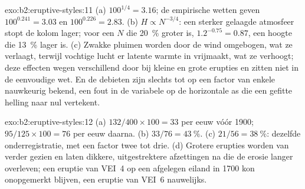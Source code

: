 \begin{solution}{exo:b2:eruptive-styles:11}
(a) $100^{1/4} = 3.16$; de empirische wetten geven $100^{0.241} = 3.03$ en
$100^{0.226} = 2.83$. (b) $H \propto N^{-3/4}$: een sterker gelaagde
atmosfeer stopt de kolom lager; voor een $N$ die \qty{20}{\percent} groter is,
$1.2^{-0.75} = 0.87$, een hoogte die \qty{13}{\percent} lager is. (c) Zwakke pluimen worden
door de wind omgebogen, wat ze verlaagt, terwijl vochtige lucht er latente warmte in
vrijmaakt, wat ze verhoogt; deze effecten wegen verschillend door bij kleine en grote
erupties en zitten niet in de eenvoudige wet. En de debieten zijn slechts tot op een factor
van enkele nauwkeurig bekend, een fout in de variabele op de horizontale as die
een gefitte helling naar nul vertekent.
\end{solution}

\begin{solution}{exo:b2:eruptive-styles:12}
(a) $132/400\times100 = 33$ per eeuw vóór 1900; $95/125\times100 = 76$ per
eeuw daarna. (b) $33/76 = \qty{43}{\percent}$. (c) $21/56 = \qty{38}{\percent}$:
dezelfde onderregistratie, met een factor twee tot drie. (d) Grotere erupties worden
van verder gezien en laten dikkere, uitgestrektere afzettingen na die de erosie
langer overleven; een eruptie van VEI~4 op een afgelegen eiland in 1700 kon onopgemerkt blijven, een
eruptie van VEI~6 nauwelijks.
\end{solution}

